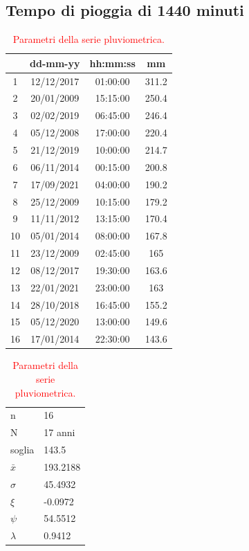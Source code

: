 \subsection{Tempo di pioggia di 1440 minuti}

\begin{table}[H]
    \caption*{Evento pluviometrico di 1440 minuti.}
    \begin{minipage}{.5\linewidth}
      \caption{\textcolor{red}{Campione della serie pluviometrica.}}
      \centering
        \begin{tabular}{cccc}
            \toprule
            & dd-mm-yy   & hh:mm:ss & mm  \\
         \midrule
         1  & 12/12/2017 & 01:00:00 & 311.2 \\
         2  & 20/01/2009 & 15:15:00 & 250.4 \\
         3  & 02/02/2019 & 06:45:00 & 246.4 \\
         4  & 05/12/2008 & 17:00:00 & 220.4 \\
         5  & 21/12/2019 & 10:00:00 & 214.7 \\
         6  & 06/11/2014 & 00:15:00 & 200.8 \\
         7  & 17/09/2021 & 04:00:00 & 190.2 \\
         8  & 25/12/2009 & 10:15:00 & 179.2 \\
         9  & 11/11/2012 & 13:15:00 & 170.4 \\
         10 & 05/01/2014 & 08:00:00 & 167.8 \\
         11 & 23/12/2009 & 02:45:00 & 165   \\
         12 & 08/12/2017 & 19:30:00 & 163.6 \\
         13 & 22/01/2021 & 23:00:00 & 163   \\
         14 & 28/10/2018 & 16:45:00 & 155.2 \\
         15 & 05/12/2020 & 13:00:00 & 149.6 \\
         16 & 17/01/2014 & 22:30:00 & 143.6 \\
         \bottomrule
        \end{tabular}
    \end{minipage}%
    \begin{minipage}{.5\linewidth}
      \centering
        \caption{\textcolor{red}{Parametri della serie pluviometrica.}}
        \begin{tabular}{ll}
            \toprule
            n        &   16      \\
            N        & 17 anni \\
            soglia   &     143.5    \\
            $\bar{x}$ &    193.2188\\
            $\sigma$ &     45.4932    \\
            $\xi$      &     -0.0972  \\
            $\psi$      &   54.5512  \\
            $\lambda$   &   0.9412 \\
        \bottomrule        
        \end{tabular}
    \end{minipage} 
\end{table}

